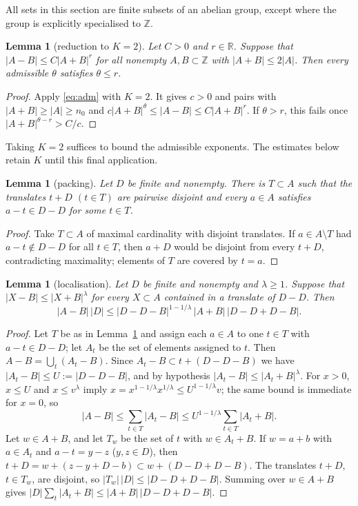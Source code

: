 \documentclass[11pt]{amsart}
\newtheorem{lemma}[theorem]{Lemma}
\theoremstyle{definition}
\theoremstyle{remark}
\numberwithin{equation}{section}
\newcommand{\Z}{\mathbb{Z}}
\newcommand{\R}{\mathbb{R}}
\begin{document}
All sets in this section are finite subsets of an abelian group, except where
the group is explicitly specialised to $\Z$.

\begin{lemma}[reduction to $K=2$]\label{lem:window}
Let $C>0$ and $r\in\R$. Suppose that $|A-B|\le C|A+B|^{r}$ for all nonempty $A,B\subset\Z$ with
$|A+B|\le2|A|$. Then every admissible $\theta$ satisfies $\theta\le r$.
\end{lemma}

\begin{proof}
Apply \eqref{eq:adm} with $K=2$. It gives $c>0$ and pairs with $|A+B|\ge|A|\ge n_0$ and
$c|A+B|^{\theta}\le|A-B|\le C|A+B|^{r}$. If $\theta>r$, this fails once
$|A+B|^{\theta-r}>C/c$.
\end{proof}

Taking $K=2$ suffices to bound the admissible exponents. The estimates
below retain $K$ until this final application.

\begin{lemma}[packing]\label{lem:packing}
Let $D$ be finite and nonempty. There is $T\subset A$ such that the translates $t+D$ $(t\in T)$
are pairwise disjoint and every $a\in A$ satisfies $a-t\in D-D$ for some $t\in T$.
\end{lemma}

\begin{proof}
Take $T\subset A$ of maximal cardinality with disjoint translates. If $a\in A\setminus T$ had
$a-t\notin D-D$ for all $t\in T$, then $a+D$ would be disjoint from every $t+D$, contradicting
maximality; elements of $T$ are covered by $t=a$.
\end{proof}

\begin{lemma}[localisation]\label{lem:local}
Let $D$ be finite and nonempty and $\lambda\ge1$. Suppose that $|X-B|\le|X+B|^{\lambda}$ for every
$X\subset A$ contained in a translate of $D-D$. Then
\[
  |A-B|\,|D|\le |D-D-B|^{1-1/\lambda}\,|A+B|\,|D-D+D-B|.
\]
\end{lemma}

\begin{proof}
Let $T$ be as in Lemma~\ref{lem:packing} and assign each $a\in A$ to one $t\in T$ with
$a-t\in D-D$; let $A_t$ be the set of elements assigned to $t$. Then $A-B=\bigcup_t(A_t-B)$.
Since $A_t-B\subset t+(D-D-B)$ we have $|A_t-B|\le U:=|D-D-B|$, and by hypothesis
$|A_t-B|\le|A_t+B|^\lambda$. For $x>0$, $x\le U$ and $x\le v^\lambda$ imply
$x=x^{1-1/\lambda}x^{1/\lambda}\le U^{1-1/\lambda}v$;
the same bound is immediate for $x=0$, so
\[
  |A-B|\le\sum_{t\in T}|A_t-B|\le U^{1-1/\lambda}\sum_{t\in T}|A_t+B| .
\]
Let $w\in A+B$, and let $T_w$ be the set of $t$ with $w\in A_t+B$. If $w=a+b$ with $a\in A_t$ and
$a-t=y-z$ ($y,z\in D$), then $t+D=w+(z-y+D-b)\subset w+(D-D+D-B)$. The translates $t+D$,
$t\in T_w$, are disjoint, so $|T_w|\,|D|\le|D-D+D-B|$. Summing over $w\in A+B$ gives
$|D|\sum_t|A_t+B|\le|A+B|\,|D-D+D-B|$.
\end{proof}
\end{document}
